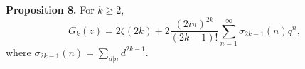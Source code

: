\textbf{Proposition 8.} For $k \geq 2$,
$$G_k(z) = 2\zeta(2k) + 2\frac{(2i\pi)^{2k}}{(2k-1)!}\sum_{n=1}^{\infty} \sigma_{2k-1}(n) q^n,$$
where $\sigma_{2k-1}(n) = \sum_{d|n} d^{2k-1}$.
